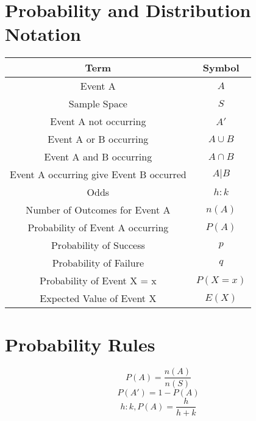 \documentclass{article}
\begin{document}
\section{Probability and Distribution Notation}
\begin{center}
\def\arraystretch{1}
{\setlength{\tabcolsep}{3em}
\begin{tabular}{| c | c |} 
 \hline
   \textbf{Term} & \textbf{Symbol}\\ 
 \hline
Event A    & \(A\) \\
 \hline
Sample Space    & \(S\) \\
 \hline
Event A not occurring	& \(A'\) \\
 \hline
Event A or B occurring	& \(A \cup B\) \\
 \hline
Event A and B occurring	& \(A \cap B\) \\
 \hline
Event A occurring give Event B occurred	& \(A | B\) \\
 \hline
Odds & \(h : k\) \\
 \hline
 Number of Outcomes for Event A    & \(n(A)\) \\
 \hline
Probability of Event A occurring	& \(P(A)\) \\
 \hline
Probability of Success	& \(p\) \\
 \hline
Probability of Failure	& \(q\) \\
 \hline
Probability of Event X = x	& \(P(X = x)\) \\
  \hline
Expected Value of Event X	& \(E(X)\) \\
  \hline
\end{tabular}}
\end{center}

\section{Probability Rules}
\[P(A) = \frac{n(A)}{n(S)}\]
\[P(A') = 1 - P(A)\]
\[h : k, P(A) = \frac{h}{h+k}\]
\end{document}

